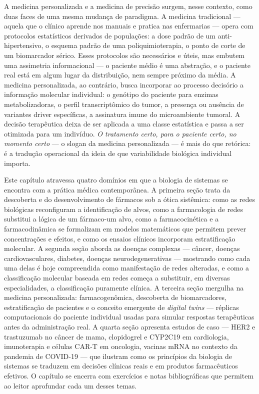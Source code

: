 A medicina personalizada e a medicina de precisão surgem, nesse contexto, como duas faces de uma mesma mudança de paradigma. A medicina tradicional --- aquela que o clínico aprende nos manuais e pratica nas enfermarias --- opera com protocolos estatísticos derivados de populações: a dose padrão de um anti-hipertensivo, o esquema padrão de uma poliquimioterapia, o ponto de corte de um biomarcador sérico. Esses protocolos são necessários e úteis, mas embutem uma assimetria informacional --- o paciente médio é uma abstração, e o paciente real está em algum lugar da distribuição, nem sempre próximo da média. A medicina personalizada, ao contrário, busca incorporar ao processo decisório a informação molecular individual: o genótipo do paciente para enzimas metabolizadoras, o perfil transcriptômico do tumor, a presença ou ausência de variantes driver específicas, a assinatura imune do microambiente tumoral. A decisão terapêutica deixa de ser aplicada a uma classe estatística e passa a ser otimizada para um indivíduo. \emph{O tratamento certo, para o paciente certo, no momento certo} --- o slogan da medicina personalizada --- é mais do que retórica: é a tradução operacional da ideia de que variabilidade biológica individual importa.

Este capítulo atravessa quatro domínios em que a biologia de sistemas se encontra com a prática médica contemporânea. A primeira seção trata da descoberta e do desenvolvimento de fármacos sob a ótica sistêmica: como as redes biológicas reconfiguram a identificação de alvos, como a farmacologia de redes substitui a lógica de um fármaco-um alvo, como a farmacocinética e a farmacodinâmica se formalizam em modelos matemáticos que permitem prever concentrações e efeitos, e como os ensaios clínicos incorporam estratificação molecular. A segunda seção aborda as doenças complexas --- câncer, doenças cardiovasculares, diabetes, doenças neurodegenerativas --- mostrando como cada uma delas é hoje compreendida como manifestação de redes alteradas, e como a classificação molecular baseada em redes começa a substituir, em diversas especialidades, a classificação puramente clínica. A terceira seção mergulha na medicina personalizada: farmacogenômica, descoberta de biomarcadores, estratificação de pacientes e o conceito emergente de \emph{digital twins} --- réplicas computacionais do paciente individual usadas para simular respostas terapêuticas antes da administração real. A quarta seção apresenta estudos de caso --- HER2 e trastuzumab no câncer de mama, clopidogrel e CYP2C19 em cardiologia, imunoterapia e células CAR-T em oncologia, vacinas mRNA no contexto da pandemia de COVID-19 --- que ilustram como os princípios da biologia de sistemas se traduzem em decisões clínicas reais e em produtos farmacêuticos efetivos. O capítulo se encerra com exercícios e notas bibliográficas que permitem ao leitor aprofundar cada um desses temas.

